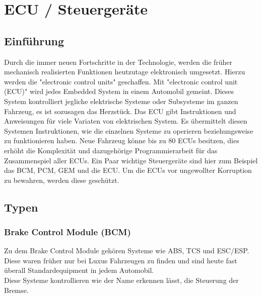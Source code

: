 \section{ECU / Steuergeräte}
    \subsection{Einführung}
    Durch die immer neuen Fortschritte in der Technologie, werden die früher mechanisch realisierten
    Funktionen heutzutage elektronisch umgesetzt. Hierzu werden die "electronic control units"
    geschaffen. Mit "electronic control unit (ECU)" wird jedes Embedded System in einem
    Automobil gemeint. Dieses System kontrolliert jegliche elektrische Systeme
    oder Subsysteme im ganzen Fahrzeug, es ist sozusagen das Herzstück. Das ECU gibt
    Instruktionen und Anweisungen für viele Variaten von elektrischen System. Es übermittelt
    diesen Systemen Instruktionen, wie die einzelnen Systeme zu operieren beziehungsweise
    zu funktionieren haben. Neue Fahrzeug könne bis zu 80 ECUs besitzen, dies erhöht die
    Komplexität und dazugehörige Programmierarbeit für das Zusammenspiel aller ECUs. Ein
    Paar wichtige Steuergeräte sind hier zum Beispiel das BCM, PCM, GEM und die ECU.
    Um die ECUs vor ungewollter Korruption zu bewahren, werden diese geschützt. 

    \subsection{Typen}
        \subsubsection{Brake Control Module (BCM)}
        Zu dem Brake Control Module gehören Systeme wie ABS, TCS und ESC/ESP. Diese waren früher
        nur bei Luxus Fahrzeugen zu finden und sind heute fast überall Standardequipment in jedem
        Automobil.\\
        Diese Systeme kontrollieren wie der Name erkennen lässt, die Steuerung der Bremse.

